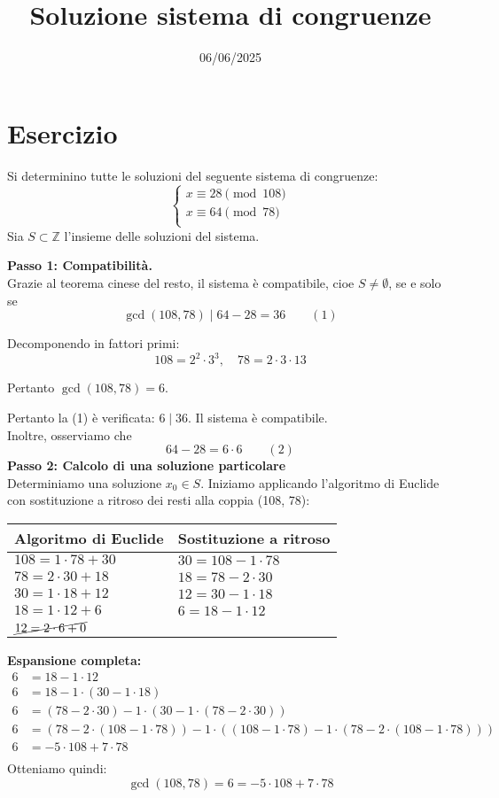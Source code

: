 \documentclass[12pt]{article}
\begin{document}
\title{Soluzione sistema di congruenze}
\date{06/06/2025}
\maketitle
\section*{Esercizio}
Si determinino tutte le soluzioni del seguente sistema di congruenze:
\[
\begin{cases}
x \equiv 28 \pmod{108} \\
x \equiv 64 \pmod{78} \\
\end{cases}
\]
Sia $S \subset \mathbb{Z}$ l'insieme delle soluzioni del sistema.

\textbf{Passo 1: Compatibilità.} \\ 
Grazie al teorema cinese del resto, il sistema è compatibile, cioe $S \neq \emptyset$, se e solo se
$$\gcd(108, 78) \mid 64 - 28 = 36 \qquad (1)$$

Decomponendo in fattori primi:
$$108 = 2^{2} \cdot 3^{3}, \quad 78 = 2 \cdot 3 \cdot 13$$

Pertanto $\gcd(108, 78) = 6$.

Pertanto la (1) è verificata: $6 \mid 36$. Il sistema è compatibile.\\
Inoltre, osserviamo che $$64 - 28 = 6 \cdot 6 \qquad (2)$$
\textbf{Passo 2: Calcolo di una soluzione particolare} \\
Determiniamo una soluzione $x_0 \in S$.
Iniziamo applicando l'algoritmo di Euclide con sostituzione a ritroso dei resti alla coppia (108, 78):
\begin{center}
\setlength{\arrayrulewidth}{0.5pt}
\begin{tabular}{|p{5cm}|p{9cm}|}
\hline
\textbf{Algoritmo di Euclide} & \textbf{Sostituzione a ritroso} \\
\hline
$108 = 1 \cdot  78 + 30$ & $30 = 108 - 1 \cdot  78$ \\
\hline
$78 = 2 \cdot  30 + 18$ & $18 = 78 - 2 \cdot  30$ \\
\hline
$30 = 1 \cdot  18 + 12$ & $12 = 30 - 1 \cdot  18$ \\
\hline
$18 = 1 \cdot  12 + 6$ & $6 = 18 - 1 \cdot  12$ \\
\hline
$\cancel{12 = 2 \cdot  6 + 0}$ & \\
\hline
\end{tabular}
\end{center}
\textbf{Espansione completa:}
\begin{align*}
6 &= 18 - 1\cdot12\\
6 &= 18 - 1\cdot(30 - 1\cdot18)\\
6 &= (78 - 2\cdot30) - 1\cdot(30 - 1\cdot(78 - 2\cdot30))\\
6 &= (78 - 2\cdot(108 - 1\cdot78)) - 1\cdot((108 - 1\cdot78) - 1\cdot(78 - 2\cdot(108 - 1\cdot78)))\\
6 &= -5\cdot108 + 7\cdot78\\
\end{align*}
Otteniamo quindi: $$\gcd(108, 78) = 6 = -5 \cdot 108 + 7 \cdot 78$$
\end{document}
